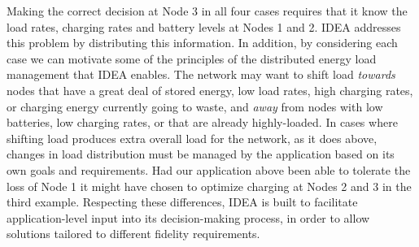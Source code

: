 Making the correct decision at Node 3 in all four cases requires that it know
the load rates, charging rates and battery levels at Nodes 1 and 2. IDEA
addresses this problem by distributing this information. In addition, by
considering each case we can motivate some of the principles of the
distributed energy load management that IDEA enables. The network may want to
shift load \textit{towards} nodes that have a great deal of stored energy,
low load rates, high charging rates, or charging energy currently
going to waste, and \textit{away} from nodes with low batteries, low
charging rates, or that are already highly-loaded. In cases where shifting
load produces extra overall load for the network, as it does above, changes
in load distribution must be managed by the application based on
its own goals and requirements. Had our application above been able to
tolerate the loss of Node 1 it might have chosen to optimize charging at
Nodes 2 and 3 in the third example. Respecting these differences, IDEA
is built to facilitate application-level input into its decision-making
process, in order to allow solutions tailored to different fidelity
requirements.

